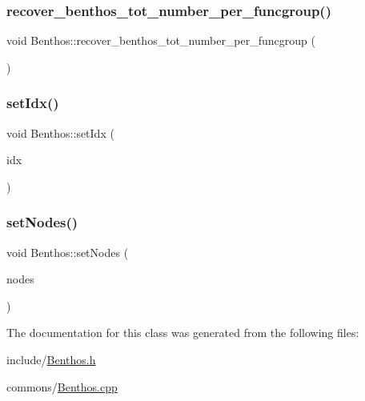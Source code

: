 \subsubsection{\texorpdfstring{recover\_benthos\_tot\_number\_per\_funcgroup()}{recover\_benthos\_tot\_number\_per\_funcgroup()}}
{\footnotesize\ttfamily void Benthos\+::recover\+\_\+benthos\+\_\+tot\+\_\+number\+\_\+per\+\_\+funcgroup (\begin{DoxyParamCaption}{ }\end{DoxyParamCaption})}

\mbox{\label{class_benthos_ab7cc01304c1a22b2cdbce3fbf75f5258}} 
\subsubsection{\texorpdfstring{setIdx()}{setIdx()}}
{\footnotesize\ttfamily void Benthos\+::set\+Idx (\begin{DoxyParamCaption}\item[{int}]{idx }\end{DoxyParamCaption})}

\mbox{\label{class_benthos_a808d6b54f6bb55dd1ec201e67a582968}} 
\subsubsection{\texorpdfstring{setNodes()}{setNodes()}}
{\footnotesize\ttfamily void Benthos\+::set\+Nodes (\begin{DoxyParamCaption}\item[{const Q\+List$<$ \mbox{\hyperlink{class_node_data}{Node\+Data}} $\ast$ $>$ \&}]{nodes }\end{DoxyParamCaption})}



The documentation for this class was generated from the following files\+:\begin{DoxyCompactItemize}
\item 
include/\mbox{\hyperlink{include_2_benthos_8h}{Benthos.\+h}}\item 
commons/\mbox{\hyperlink{commons_2_benthos_8cpp}{Benthos.\+cpp}}\end{DoxyCompactItemize}
